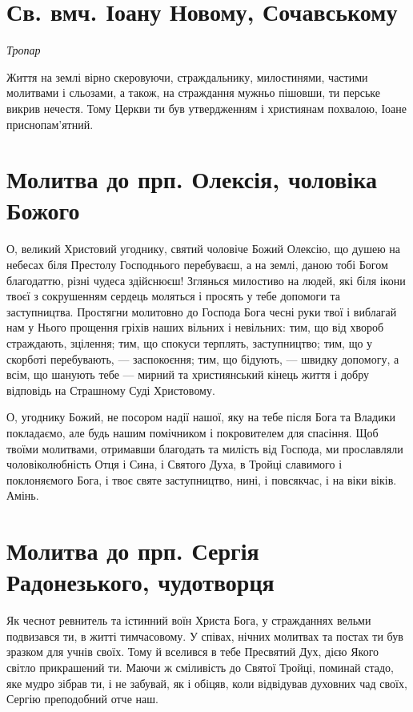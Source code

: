 \documentclass[chapters.tex]{subfiles}
\begin{document}
\section{Св. вмч. Іоану Новому, Сочавському}
\emph{Тропар}

Життя на землі вірно скеровуючи, страждальнику, милостинями, частими молитвами і сльозами, а також, на страждання мужньо пішовши, ти перське викрив нечестя. Тому Церкви ти був утвердженням і християнам похвалою, Іоане приснопам’ятний.

\section{Молитва до прп. Олексія, чоловіка Божого}
О, великий Христовий угоднику, святий чоловіче Божий Олексію, що душею на небесах біля Престолу Господнього перебуваєш, а на землі, даною тобі Богом благодаттю, різні чудеса здійснюєш! Зглянься милостиво на людей, які біля ікони твоєї з сокрушенням сердець моляться і просять у тебе допомоги та заступництва. Простягни молитовно до Господа Бога чесні руки твої і виблагай нам у Нього прощення гріхів наших вільних і невільних: тим, що від хвороб страждають, зцілення; тим, що спокуси терплять, заступництво; тим, що у скорботі перебувають, — заспокоєння; тим, що бідують, — швидку допомогу, а всім, що шанують тебе — мирний та християнський кінець життя і добру відповідь на Страшному Суді Христовому.

О, угоднику Божий, не посором надії нашої, яку на тебе після Бога та Владики покладаємо, але будь нашим помічником і покровителем для спасіння. Щоб твоїми молитвами, отримавши благодать та милість від Господа, ми прославляли чоловіколюбність Отця і Сина, і Святого Духа, в Тройці славимого і поклоняємого Бога, і твоє святе заступництво, нині, і повсякчас, і на віки віків. Амінь.

\section{Молитва до прп. Сергія Радонезького, чудотворця}
Як чеснот ревнитель та істинний воїн Христа Бога, у стражданнях вельми подвизався ти, в житті тимчасовому. У співах, нічних молитвах та постах ти був зразком для учнів своїх. Тому й вселився в тебе Пресвятий Дух, дією Якого світло прикрашений ти. Маючи ж сміливість до Святої Тройці, поминай стадо, яке мудро зібрав ти, і не забувай, як і обіцяв, коли відвідував духовних чад своїх, Сергію преподобний отче наш.
\end{document}
